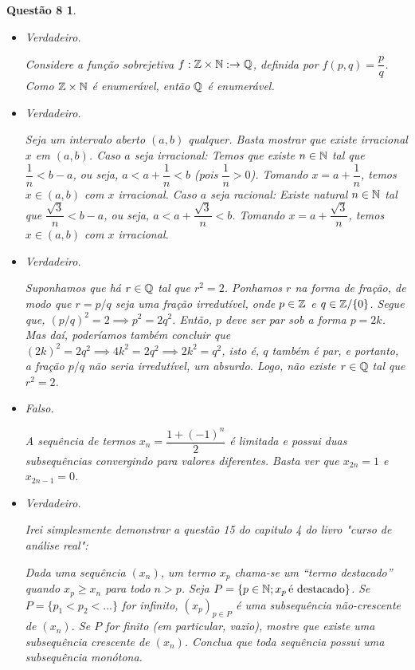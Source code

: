 \documentclass[a4paper,12pt]{article}
\newtheorem*{8}{Questão 8}
\begin{document}
\begin{8}
	
	\begin{itemize}
		\item Verdadeiro.
		
		Considere a função sobrejetiva $f: \Bbb Z \times \Bbb N: \to \Bbb Q$, definida por $f(p,q) = \dfrac{p}{q}$. Como $\Bbb Z \times \Bbb N$ é enumerável, então $\Bbb Q$ é enumerável.
		
		\item Verdadeiro. 
		
		Seja um intervalo aberto $(a,b)$ qualquer. Basta mostrar que existe irracional $x$ em $(a,b)$. Caso $a$ seja irracional: Temos que existe $n \in \Bbb N$ tal que $\dfrac{1}{n} < b-a$, ou seja, $a < a+\dfrac{1}{n} < b$ (pois $\dfrac{1}{n} > 0$). Tomando $x = a + \dfrac{1}{n}$, temos $x \in (a,b)$ com $x$ irracional. Caso $a$ seja racional: Existe natural $n \in \Bbb N$ tal que $\dfrac{\sqrt 3}{n} < b-a$, ou seja, $a < a+\dfrac{\sqrt 3}{n} < b$. Tomando $x = a + \dfrac{\sqrt 3}{n}$, temos $x \in (a,b)$ com $x$ irracional.
		
		\item Verdadeiro.
		
		Suponhamos que há $r \in \Bbb Q$ tal que $r^2 = 2$. Ponhamos $r$ na forma de fração, de modo que $r = p/q$ seja uma fração irredutível, onde $p \in \Bbb Z$ e  $q \in \Bbb Z/\{0\}$. Segue que, $(p/q)^2 = 2 \implies p^2 = 2q^2$. Então, $p$ deve ser par sob a forma $p = 2k$. Mas daí, poderíamos também concluir que $(2k)^2 = 2q^2 \implies 4k^2 = 2q^2 \implies 2k^2 = q^2$, isto é, $q$ também é par, e portanto, a fração $p/q$ não seria irredutível, um absurdo. Logo, não existe $r \in \Bbb Q$ tal que $r^2 = 2$.
		
		\item Falso.
		
		A sequência de termos $x_n = \dfrac{1 + (-1)^n}{2}$ é limitada e possui duas subsequências convergindo para valores diferentes. Basta ver que $x_{2n} = 1$ e $x_{2n-1} = 0$.
		
		\item Verdadeiro.
		
		Irei simplesmente demonstrar a questão 15 do capitulo 4 do livro \textit{"curso de análise real"}:
		
		Dada uma sequência $(x_n)$, um termo $x_p$ chama-se um ``termo destacado'' quando $x_p \geq x_n$ para todo $n > p$. Seja $P = \{p \in \Bbb N; x_p \, \text{é destacado}\}$. Se $P = \{p_1 < p_2 < ...\}$ for infinito, $(x_p)_{p \in P}$ é uma subsequência não-crescente de $(x_n)$. Se $P$ for finito (em particular, vazio), mostre que existe uma subsequência crescente de $(x_n)$. Conclua que toda sequência possui uma subsequência monótona.
		

\end{itemize}
\end{8}
\end{document}
